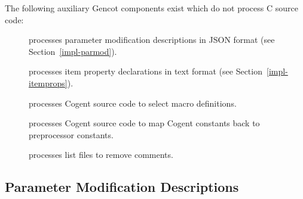 The following auxiliary Gencot components exist which do not process C source code:
\begin{description}
\item[] processes parameter modification descriptions in JSON format (see Section~\ref{impl-parmod}).
\item[] processes item property declarations in text format (see Section~\ref{impl-itemprops}).
\item[] processes Cogent source code to select macro definitions.
\item[] processes Cogent source code to map Cogent constants back to preprocessor constants.
\item[] processes list files to remove comments.
\end{description}

\subsection{Parameter Modification Descriptions}
\label{impl-ocomps-parmod}

